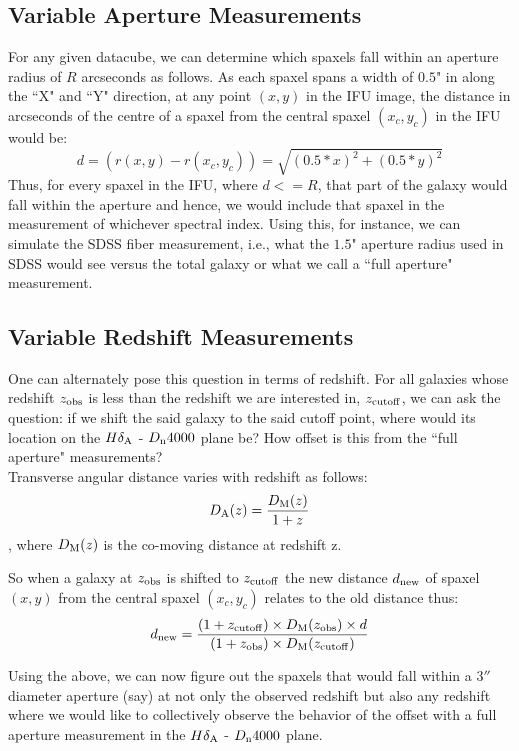 \subsection{Variable Aperture Measurements}
For any given datacube, we can determine which spaxels fall within an aperture radius of $R$ arcseconds as follows. As each spaxel spans a width of $0.5$" in along the ``X" and ``Y" direction, at any point $(x,y)$ in the IFU image, the distance in arcseconds of the centre of a spaxel from the central spaxel $(x_{c},y_{c})$ in the IFU would be:
$$ d = (r(x,y) - r(x_{c},y_{c})) = \sqrt{(0.5*x)^2 + (0.5*y)^2} $$
Thus, for every spaxel in the IFU, where $d<=R$, that part of the galaxy would fall within the aperture and hence, we would include that spaxel in the measurement of whichever spectral index. Using this, for instance, we can simulate the SDSS fiber measurement, i.e.,  what the $1.5$" aperture radius used in SDSS would see versus the total galaxy or what we call a ``full aperture" measurement.

\subsection{Variable Redshift Measurements}
One can alternately pose this question in terms of redshift. For all galaxies whose redshift $z_{\rm obs}$ is less than the redshift we are interested in, $z_{\rm cutoff}$, we can ask the question: if we shift the said galaxy to the said cutoff point, where would its location on the $H\delta_{\rm A}$ - $D_{\rm n}4000$ plane be? How offset is this from the ``full aperture" measurements?\\

Transverse angular distance varies with redshift as follows:
$$D_{\rm A}(z) = \frac{D_{\rm M}(z)}{1+z} $$,
where $D_{\rm M}(z)$ is the co-moving distance at redshift z.

So when a galaxy at $z_{\rm obs}$ is shifted to $z_{\rm cutoff}$ the new distance $d_{\rm new}$ of spaxel $(x,y)$ from the central spaxel $(x_{c},y_{c})$ relates to the old distance thus:
$$ d_{\rm new} = \frac{(1+z_{\rm cutoff})\times D_{\rm M}(z_{\rm obs}) \times d}{(1+z_{\rm obs}) \times  D_{\rm M}(z_{\rm cutoff})} $$

Using the above, we can now figure out the spaxels that would fall within a $3''$ diameter aperture (say) at not only the observed redshift but also any redshift where we would like to collectively observe the behavior of the offset with a full aperture measurement in the $H\delta_{\rm A}$ - $D_{\rm n}4000$ plane.


